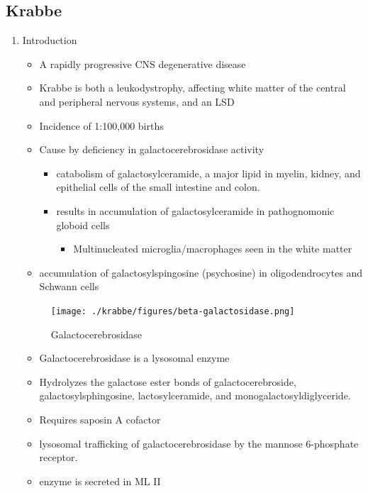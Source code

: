 \documentclass{scrartcl}
\begin{document}
\subsection{Krabbe}
\label{sec:orgf4810f2}
\begin{enumerate}
\item Introduction
\label{sec:org4f144b9}
\begin{itemize}
\item A rapidly progressive CNS degenerative disease
\item Krabbe is both a leukodystrophy, affecting white matter of the central
and peripheral nervous systems, and an LSD

\item Incidence of 1:100,000 births
\item Cause by deficiency in galactocerebrosidase activity
\begin{itemize}
\item catabolism of galactosylceramide, a major lipid in myelin, kidney, and epithelial cells of the small intestine and colon.
\item results in accumulation of galactosylceramide in pathognomonic globoid cells
\begin{itemize}
\item Multinucleated microglia/macrophages seen in the white matter
\end{itemize}
\end{itemize}
\item accumulation of galactosylspingosine (psychosine) in oligodendrocytes and Schwann cells
\end{itemize}

\begin{figure}[htbp]
\centering
\texttt{[image: ./krabbe/figures/beta-galactosidase.png]}
\caption{\label{fig:orga40f8e5}
Galactocerebrosidase}
\end{figure}

\begin{itemize}
\item Galactocerebrosidase is a lysosomal enzyme
\item Hydrolyzes the galactose ester bonds of galactocerebroside, galactosylsphingosine, lactosylceramide, and monogalactosyldiglyceride.
\item Requires saposin A cofactor
\item lysosomal trafficking of galactocerebrosidase by the mannose 6-phosphate receptor.
\item enzyme is secreted in ML II
\end{itemize}


\end{enumerate}
\end{document}
